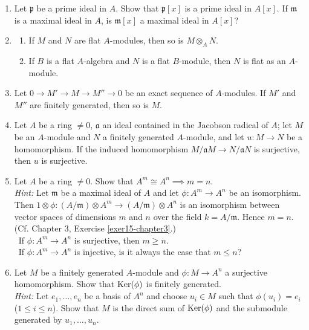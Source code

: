 \begin{enumerate}
    \quad\, Show that $M[x] \cong A[x] \otimes_A M$.

    \item \label{exer7-chapter2}Let $\mathfrak{p}$ be a prime ideal in $A$. Show that $\mathfrak{p}[x]$ is a prime ideal in $A[x]$. If $\mathfrak{m}$ is a maximal ideal in $A$, is $\mathfrak{m}[x]$ a maximal ideal in $A[x]$?

    \item \label{exer8-chapter2}\begin{enumerate}
        \item If $M$ and $N$ are flat $A$-modules, then so is $M \otimes_A N$.
        \item If $B$ is a flat $A$-algebra and $N$ is a flat $B$-module, then $N$ is flat as an $A$-module.
    \end{enumerate}

    \item \label{exer9-chapter2}Let $0 \to M' \to M \to M'' \to 0$ be an exact sequence of $A$-modules. If $M'$ and $M''$ are finitely generated, then so is $M$.

    \item \label{exer10-chapter2}Let $A$ be a ring $\neq 0$, $\mathfrak{a}$ an ideal contained in the Jacobson radical of $A$; let $M$ be an $A$-module and $N$ a finitely generated $A$-module, and let $u \colon M \to N$ be a homomorphism. If the induced homomorphism $M/\mathfrak{a}M \to N/\mathfrak{a}N$ is surjective, then $u$ is surjective.

    \item \label{exer11-chapter2}Let $A$ be a ring $\neq 0$. Show that $A^m \cong A^n \implies m = n$.\\
    \textit{Hint:} Let $\mathfrak{m}$ be a maximal ideal of $A$ and let $\phi \colon A^m \to A^n$ be an isomorphism. Then $1 \otimes \phi \colon (A/\mathfrak{m}) \otimes A^m \to (A/\mathfrak{m}) \otimes A^n$ is an isomorphism between vector spaces of dimensions $m$ and $n$ over the field $k = A/\mathfrak{m}$. Hence $m = n$. (Cf. Chapter 3, Exercise \ref{exer15-chapter3}.)\\
    \quad\, If $\phi \colon A^m \to A^n$ is surjective, then $m \geq n$.\\
    \quad\, If $\phi \colon A^m \to A^n$ is injective, is it always the case that $m \leq n$?

    \item \label{exer12-chapter2}Let $M$ be a finitely generated $A$-module and $\phi \colon M \to A^n$ a surjective homomorphism. Show that $\operatorname{Ker}(\phi)$ is finitely generated.\\
    \textit{Hint:} Let $e_1, \ldots, e_n$ be a basis of $A^n$ and choose $u_i \in M$ such that $\phi(u_i) = e_i$ ($1 \leq i \leq n$). Show that $M$ is the direct sum of $\operatorname{Ker}(\phi)$ and the submodule generated by $u_1, \ldots, u_n$.


\end{enumerate}
